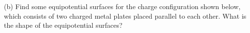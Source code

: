 {\centering {} \par}

(b) Find some equipotential surfaces for the charge configuration
shown below, which consists of two charged metal plates placed parallel
to each other. What is the shape of the equipotential surfaces?

{\centering {} \par}

